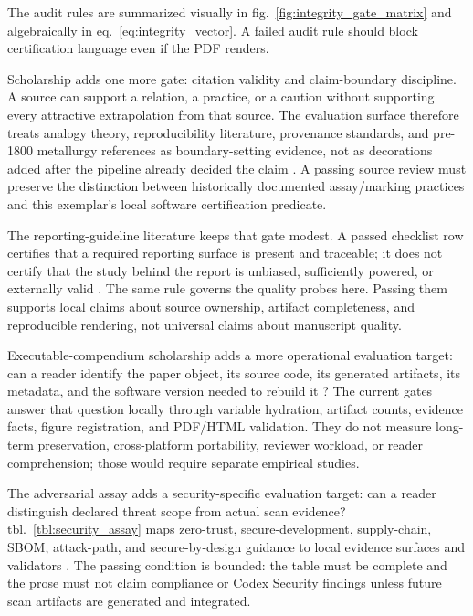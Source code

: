 \documentclass[
]{article}
\begin{document}
The audit rules are summarized visually in
fig.~\ref{fig:integrity_gate_matrix} and algebraically in
eq.~\ref{eq:integrity_vector}. A failed audit rule should block
certification language even if the PDF renders.

Scholarship adds one more gate: citation validity and claim-boundary
discipline. A source can support a relation, a practice, or a caution
without supporting every attractive extrapolation from that source. The
evaluation surface therefore treats analogy theory, reproducibility
literature, provenance standards, and pre-1800 metallurgy references as
boundary-setting evidence, not as decorations added after the pipeline
already decided the claim
\citep{gentner1983structure, peng2011reproducible, wilkinson2016fair, biringuccio_pirotechnia_1540, agricola_de_re_metallica_1556, badcock_touchstone_1678, cramer_assaying_metals_1741}.
A passing source review must preserve the distinction between
historically documented assay/marking practices and this exemplar's
local software certification predicate.

The reporting-guideline literature keeps that gate modest. A passed
checklist row certifies that a required reporting surface is present and
traceable; it does not certify that the study behind the report is
unbiased, sufficiently powered, or externally valid
\citep{equator_network_reporting_guidelines, vonelm2007strobe, percie_du_sert2020arrive}.
The same rule governs the quality probes here. Passing them supports
local claims about source ownership, artifact completeness, and
reproducible rendering, not universal claims about manuscript quality.

Executable-compendium scholarship adds a more operational evaluation
target: can a reader identify the paper object, its source code, its
generated artifacts, its metadata, and the software version needed to
rebuild it
\citep{nuest2017erc, chen2021metadata, smith2016softwarecitation}? The
current gates answer that question locally through variable hydration,
artifact counts, evidence facts, figure registration, and PDF/HTML
validation. They do not measure long-term preservation, cross-platform
portability, reviewer workload, or reader comprehension; those would
require separate empirical studies.

The adversarial assay adds a security-specific evaluation target: can a
reader distinguish declared threat scope from actual scan evidence?
tbl.~\ref{tbl:security_assay} maps zero-trust, secure-development,
supply-chain, SBOM, attack-path, and secure-by-design guidance to local
evidence surfaces and validators
\citep{nist_sp800_207_zero_trust, nist_sp800_218_ssdf, slsa_v1_2, sigstore_docs, mitre_attack, cyclonedx_spec, spdx_spec, cisa_secure_by_design}.
The passing condition is bounded: the table must be complete and the
prose must not claim compliance or Codex Security findings unless future
scan artifacts are generated and integrated.
\end{document}
